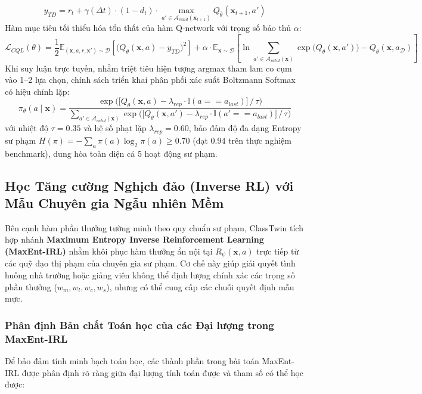 \begin{equation}\label{eq:td-target}
  y_{TD} = r_t + \gamma(\Delta t) \cdot (1 - d_t) \cdot \max_{a' \in \mathcal{A}_{valid}(\mathbf{x}_{t+1})} Q_{\bar{\theta}}(\mathbf{x}_{t+1}, a')
\end{equation}
Hàm mục tiêu tối thiểu hóa tổn thất của hàm Q-network với trọng số bảo thủ $\alpha$:
\begin{equation}\label{eq:cql-loss}
  \mathcal{L}_{CQL}(\theta) = \frac{1}{2} \mathbb{E}_{(\mathbf{x}, a, r, \mathbf{x}') \sim \mathcal{D}} \left[ \big(Q_\theta(\mathbf{x}, a) - y_{TD}\big)^2 \right] + \alpha \cdot \mathbb{E}_{\mathbf{x} \sim \mathcal{D}} \left[ \ln \sum_{a' \in \mathcal{A}_{valid}(\mathbf{x})} \exp\big(Q_\theta(\mathbf{x}, a')\big) - Q_\theta(\mathbf{x}, a_\mathcal{D}) \right]
\end{equation}
Khi suy luận trực tuyến, nhằm triệt tiêu hiện tượng argmax tham lam co cụm vào 1--2 lựa chọn, chính sách triển khai phân phối xác suất Boltzmann Softmax có hiệu chỉnh lặp:
\begin{equation}\label{eq:boltzmann-policy}
  \pi_\theta(a \mid \mathbf{x}) = \frac{\exp\Big(\big[Q_\theta(\mathbf{x}, a) - \lambda_{rep} \cdot \mathbb{I}(a == a_{last})\big] \,/\, \tau\Big)}{\sum_{a' \in \mathcal{A}_{valid}(\mathbf{x})} \exp\Big(\big[Q_\theta(\mathbf{x}, a') - \lambda_{rep} \cdot \mathbb{I}(a' == a_{last})\big] \,/\, \tau\Big)}
\end{equation}
với nhiệt độ $\tau = 0.35$ và hệ số phạt lặp $\lambda_{rep} = 0.60$, bảo đảm độ đa dạng Entropy sư phạm $H(\pi) = -\sum_a \pi(a)\log_2 \pi(a) \ge 0.70$ (đạt $0.94$ trên thực nghiệm benchmark), dung hòa toàn diện cả 5 hoạt động sư phạm.

\subsection{Học Tăng cường Nghịch đảo (Inverse RL) với Mẫu Chuyên gia Ngẫu nhiên Mềm}\label{subsec:irl-theory}
Bên cạnh hàm phần thưởng tường minh theo quy chuẩn sư phạm, ClassTwin tích hợp nhánh \textbf{Maximum Entropy Inverse Reinforcement Learning (MaxEnt-IRL)} nhằm khôi phục hàm thưởng ẩn nội tại $R_\psi(\mathbf{x}, a)$ trực tiếp từ các quỹ đạo thị phạm của chuyên gia sư phạm. Cơ chế này giúp giải quyết tình huống nhà trường hoặc giảng viên không thể định lượng chính xác các trọng số phần thưởng ($w_m, w_l, w_c, w_s$), nhưng có thể cung cấp các chuỗi quyết định mẫu mực.

\subsubsection{Phân định Bản chất Toán học của các Đại lượng trong MaxEnt-IRL}\label{subsubsec:irl-variables}
Để bảo đảm tính minh bạch toán học, các thành phần trong bài toán MaxEnt-IRL được phân định rõ ràng giữa đại lượng tính toán được và tham số có thể học được:

